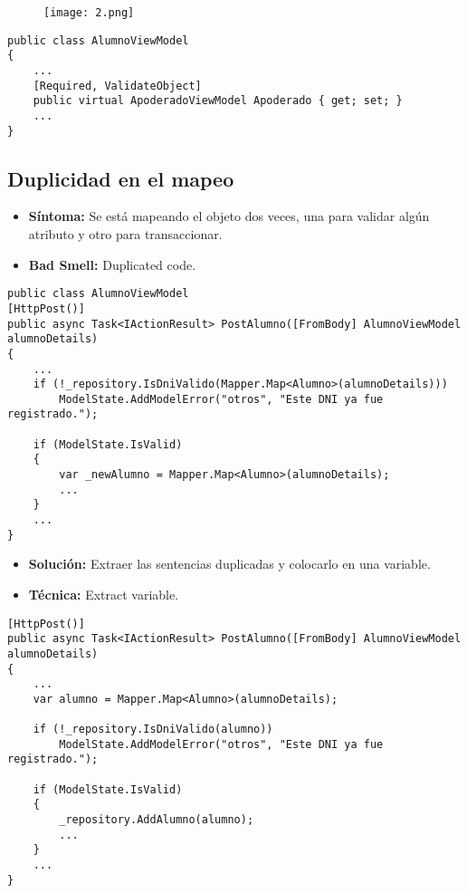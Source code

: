 \begin{figure}[h]
	\texttt{[image: 2.png]}
	\centering
\end{figure}

\begin{lstlisting}[language={[Sharp]C}]
public class AlumnoViewModel
{
	...
	[Required, ValidateObject]
	public virtual ApoderadoViewModel Apoderado { get; set; }
	...
}
\end{lstlisting}

\subsection{Duplicidad en el mapeo}
\begin{itemize}
	\item \textbf{Síntoma:} Se está mapeando el objeto dos veces, una para validar algún atributo y otro para transaccionar.
	\item \textbf{Bad Smell:} Duplicated code.
\end{itemize}

\begin{lstlisting}[language={[Sharp]C}]
public class AlumnoViewModel
[HttpPost()]
public async Task<IActionResult> PostAlumno([FromBody] AlumnoViewModel alumnoDetails)
{
	...
	if (!_repository.IsDniValido(Mapper.Map<Alumno>(alumnoDetails)))
		ModelState.AddModelError("otros", "Este DNI ya fue registrado.");

	if (ModelState.IsValid)
	{
		var _newAlumno = Mapper.Map<Alumno>(alumnoDetails);
		...
	}
	...
}
\end{lstlisting}

\begin{itemize}	
	\item \textbf{Solución:} Extraer las sentencias duplicadas y colocarlo en una variable.
	\item \textbf{Técnica:} Extract variable.
\end{itemize}
	
\begin{lstlisting}[language={[Sharp]C}]
[HttpPost()]
public async Task<IActionResult> PostAlumno([FromBody] AlumnoViewModel alumnoDetails)
{
	...
	var alumno = Mapper.Map<Alumno>(alumnoDetails);

	if (!_repository.IsDniValido(alumno))
		ModelState.AddModelError("otros", "Este DNI ya fue registrado.");

	if (ModelState.IsValid)
	{
		_repository.AddAlumno(alumno);
		...
	}
	...
}
\end{lstlisting}
	

